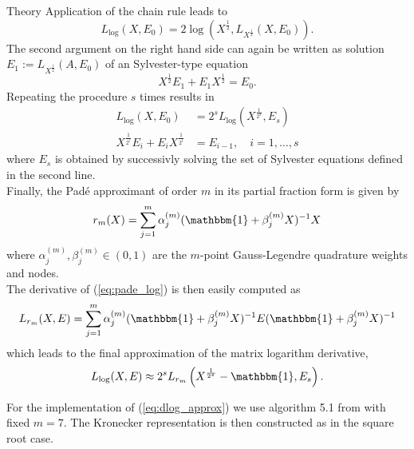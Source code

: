 \begin{chapter}{Theory}
Application of the chain rule leads to
\begin{equation}
    L_{\log}(X,E_0) = 2\log\left(X^{\frac{1}{2}},L_{X^{\frac{1}{2}}}(X,E_0)\right).
\end{equation}
The second argument on the right hand side can again be written as solution $E_1:=L_{X^{\frac{1}{2}}}(A,E_0)$ of an Sylvester-type equation
\begin{equation}
    X^{\frac{1}{2}}E_1+E_{1}X^{\frac{1}{2}}=E_0.
\end{equation}
Repeating the procedure $s$ times results in
\begin{align}
    L_{\log}(X,E_0)&=2^sL_{\log}\left(X^{\frac{1}{2^s}},E_s\right)\\
    X^{\frac{1}{2^{i}}}E_i+E_iX^{\frac{1}{2^{i}}}&=E_{i-1},\quad i=1,\ldots,s
\end{align}
where $E_s$ is obtained by successivly solving the set of Sylvester equations defined in the second line.\\

Finally, the Pad\'{e} approximant of order $m$ in its partial fraction form \cite{highham_pade} is given by
\begin{equation}
    \label{eq:pade_log}
    r_m(X) = \sum_{j=1}^{m}\alpha_j^{(m)}(\mathbbm{1}+\beta_j^{(m)}X)^{-1}X
\end{equation}
where $\alpha_{j}^{(m)},\beta_{j}^{(m)}\in (0,1)$ are the $m$-point Gauss-Legendre quadrature weights and nodes.\\

The derivative of (\ref{eq:pade_log}) is then easily computed as 
\begin{equation}
    L_{r_m}(X,E) = \sum_{j=1}^m\alpha_j^{(m)}(\mathbbm{1}+\beta_j^{(m)}X)^{-1}E(\mathbbm{1}+\beta_j^{(m)}X)^{-1}
\end{equation}
which leads to the final approximation of the matrix logarithm derivative, 
\begin{equation}
    \label{eq:dlog_approx}
    L_{\log}(X,E)\approx 2^{s}L_{r_m}\left(X^{\frac{1}{2^s}}-\mathbbm{1},E_s \right).
\end{equation}

For the implementation of (\ref{eq:dlog_approx}) we use algorithm 5.1 from \cite{almohy_frechetlog} with fixed $m=7$.
The Kronecker representation is then constructed as in the square root case.








\end{chapter}
